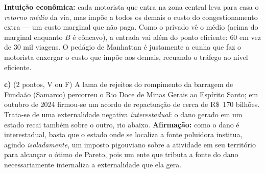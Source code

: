 \begin{solucao}
\textbf{Intui\c{c}\~ao econ\^omica:} cada motorista que entra na zona central leva para casa o \emph{retorno m\'edio} da via, mas impõe a todos os demais o custo do congestionamento extra --- um custo marginal que n\~ao paga. Como o privado v\^e o m\'edio (acima do marginal enquanto $B$ \'e c\^oncavo), a entrada vai al\'em do ponto eficiente: $60$ em vez de $30$ mil viagens. O ped\'agio de Manhattan \'e justamente a cunha que faz o motorista enxergar o custo que impõe aos demais, recuando o tr\'afego ao n\'ivel eficiente.
\end{solucao}

\textbf{c)} (2 pontos, V ou F) A lama de rejeitos do rompimento da barragem de Funda\~ao (Samarco) percorreu o Rio Doce de Minas Gerais ao Esp\'irito Santo; em outubro de 2024 firmou-se um acordo de repactua\c{c}\~ao de cerca de R\$~170 bilh\~oes. Trata-se de uma externalidade negativa \emph{interestadual}: o dano gerado em um estado recai tamb\'em sobre o outro, rio abaixo. \textbf{Afirma\c{c}\~ao:} como o dano \'e interestadual, basta que o estado onde se localiza a fonte poluidora institua, agindo \emph{isoladamente}, um imposto pigouviano sobre a atividade em seu territ\'orio para alcan\c{c}ar o \'otimo de Pareto, pois um ente que tributa a fonte do dano necessariamente internaliza a externalidade que ela gera.

